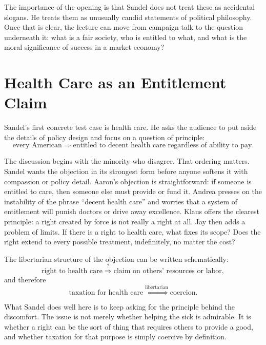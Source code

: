 The importance of the opening is that Sandel does not treat these as accidental slogans. He treats them as unusually candid statements of political philosophy. Once that is clear, the lecture can move from campaign talk to the question underneath it: what is a fair society, who is entitled to what, and what is the moral significance of success in a market economy?

\section{Health Care as an Entitlement Claim}

Sandel's first concrete test case is health care. He asks the audience to put aside the details of policy design and focus on a question of principle:
\begin{equation}
\text{every American}
\Longrightarrow
\text{entitled to decent health care regardless of ability to pay}.
\end{equation}

The discussion begins with the minority who disagree. That ordering matters. Sandel wants the objection in its strongest form before anyone softens it with compassion or policy detail. Aaron's objection is straightforward: if someone is entitled to care, then someone else must provide or fund it. Andrea presses on the instability of the phrase ``decent health care'' and worries that a system of entitlement will punish doctors or drive away excellence. Klaus offers the clearest principle: a right created by force is not really a right at all. Jay then adds a problem of limits. If there is a right to health care, what fixes its scope? Does the right extend to every possible treatment, indefinitely, no matter the cost?

The libertarian structure of the objection can be written schematically:
\begin{equation}
\text{right to health care}
\stackrel{?}{\Longrightarrow}
\text{claim on others' resources or labor},
\end{equation}
and therefore
\begin{equation}
\text{taxation for health care}
\stackrel{\text{libertarian}}{\Longrightarrow}
\text{coercion}.
\end{equation}

What Sandel does well here is to keep asking for the principle behind the discomfort. The issue is not merely whether helping the sick is admirable. It is whether a right can be the sort of thing that requires others to provide a good, and whether taxation for that purpose is simply coercive by definition.

